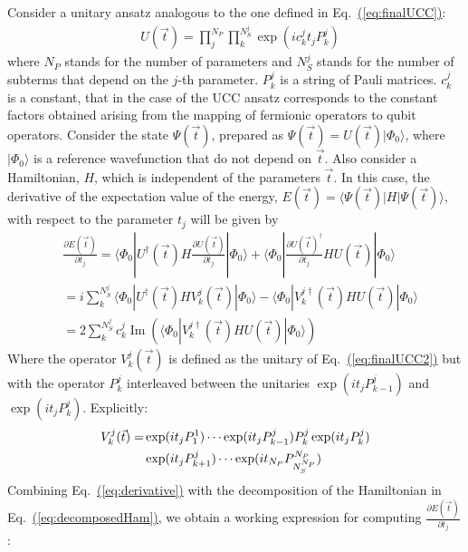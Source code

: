 \documentclass[superscriptaddress,aps,pra,twocolumn,nofootinbib,babel]{revtex4-1}
\newcommand{\eq}[1]{Eq.~\hyperref[eq:#1]{(\ref*{eq:#1})}}
\begin{document}
Consider a unitary ansatz analogous to the one defined in \eq{finalUCC}:
\begin{align}\label{eq:finalUCC2}
&U \left(\vec{t}\right) = \prod^{N_P}_j \prod^{N^j_S}_k \exp(i c^j_k t_j P^j_k )
\end{align}
where $N_P$ stands for the number of parameters and $N^j_S$ stands for the number of subterms that depend on the $j$-th parameter. $P^j_k$ is a string of Pauli matrices. $c^j_k$ is a constant, that in the case of the UCC ansatz corresponds to the constant factors obtained arising from the mapping of fermionic operators to qubit operators. Consider the state $\Psi\left(\vec{t}\right)$, prepared as $\Psi\left(\vec{t}\right) = U\left(\vec{t}\right) |\Phi_0\rangle$, where $|\Phi_0\rangle$ is a reference wavefunction that do not depend on $\vec{t}$. Also consider a Hamiltonian, $H$, which is independent of the parameters $\vec{t}$. In this case, the derivative of the expectation value of the energy, $E(\vec{t})=\langle \Psi\left(\vec{t}\right) | H |  \Psi\left(\vec{t}\right)\rangle$, with respect to the parameter $t_j$ will be given by
\begin{align}\label{eq:exactDerivative}
&\frac{\partial E(\vec{t})}{\partial t_j} = \langle \Phi_0|U^{\dagger}(\vec{t}) H  \frac{\partial U(\vec{t})}{\partial t_j} |\Phi_0\rangle + \langle \Phi_0| \frac{\partial U(\vec{t})^{\dagger}}{\partial t_j} H  U(\vec{t})|\Phi_0\rangle \\
& = i\sum^{N^{j}_S}_{k} \langle \Phi_0|U^{\dagger}(\vec{t}) H  V^{j}_{k}(\vec{t}) |\Phi_0\rangle - \langle \Phi_0| V^{j\dagger}_{k}(\vec{t}) H  U(\vec{t})|\Phi_0\rangle \\
\label{eq:derivative}
& = 2 \sum^{N^{j}_S}_{k} c^j_k \operatorname{Im} (\langle \Phi_0| V^{j\dagger}_{k}(\vec{t}) H  U(\vec{t})|\Phi_0\rangle)
\end{align}
Where the operator $V^{j}_{k}(\vec{t})$ is defined as the unitary of \eq{finalUCC2} but with the operator $P^{j}_{k}$ interleaved between the unitaries $\exp(i t_j P^j_{k-1} )$ and $\exp(i t_j P^j_k )$. Explicitly:
\begin{align}
V^{j}_{k}(\vec{t}) = & \exp(i t_j P^1_1) \cdots \exp(i t_j P^j_{k-1}) P^j_{k} \exp(i t_j P^j_{k}) \notag \\ & \exp(i t_j P^j_{k+1}) \cdots \exp(i t_{N_P} P^{N_P}_{N^{N_P}_S})
\end{align}
Combining \eq{derivative} with the decomposition of the Hamiltonian in \eq{decomposedHam}, we obtain a working expression for computing $\frac{\partial E(\vec{t})}{\partial t_j}$:
\end{document}
